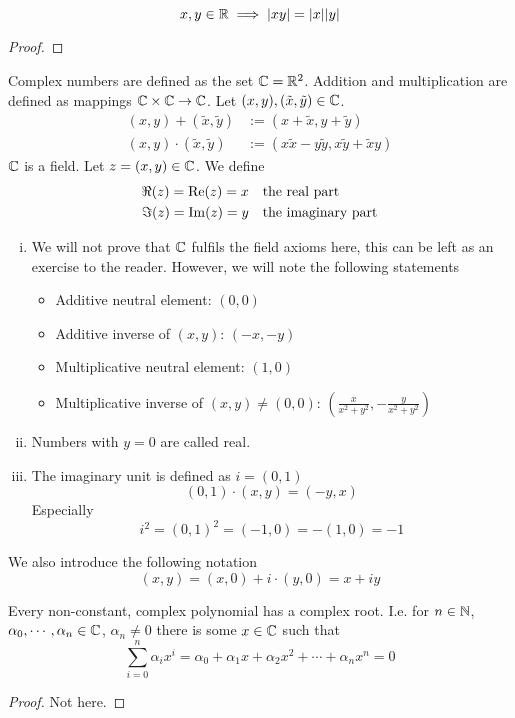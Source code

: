 \documentclass[../../script.tex]{subfiles}
\begin{document}
\begin{thm}
\[
	x, y \in \mathbb{R} \implies |xy| = |x||y|
\]
\end{thm}
\begin{proof}
\reader
\end{proof}

\begin{defi}
Complex numbers are defined as the set $\mathbb{C} = \mathbb{R}^2$. Addition and multiplication are defined as mappings $\mathbb{C} \times \mathbb{C} \rightarrow \mathbb{C}$. Let $(x, y), (\tilde{x}, \tilde{y}) \in \mathbb{C}$.
\begin{align*}
	(x, y) + (\tilde{x}, \tilde{y}) &:= (x + \tilde{x}, y + \tilde{y}) \\
	(x, y) \cdot (\tilde{x}, \tilde{y}) &:= (x\tilde{x} - y\tilde{y}, x\tilde{y} + \tilde{x}y)
\end{align*}
$\mathbb{C}$ is a field. Let $z = (x, y) \in \mathbb{C}$. We define
\begin{align*}
	\real(z) = \Re(z) = x& ~~\text{ the real part} \\
	\imag(z) = \Im(z) = y& ~~\text{ the imaginary part}
\end{align*}
\end{defi}

\begin{rem}\leavevmode
\begin{enumerate}[(i)]
	\item We will not prove that $\mathbb{C}$ fulfils the field axioms here, this can be left as an exercise to the reader. However, we will note the following statements
	\begin{itemize}
		\item Additive neutral element: $(0, 0)$
		\item Additive inverse of $(x, y)$: $(-x, -y)$
		\item Multiplicative neutral element: $(1, 0)$
		\item Multiplicative inverse of $(x, y) \ne (0, 0)$: $\left( \frac{x}{x^2 + y^2}, -\frac{y}{x^2 + y^2} \right)$
	\end{itemize}
	
	\item Numbers with $y = 0$ are called real.
	
	\item The imaginary unit is defined as $i = (0, 1)$
	\[
		(0, 1) \cdot (x, y) = (-y, x)
	\]
	Especially
	\[
		i^2 = (0, 1)^2 = (-1, 0) = -(1, 0) = -1
	\]
\end{enumerate}
We also introduce the following notation
\[
	(x, y) = (x, 0) + i\cdot(y, 0) = x + iy
\]
\end{rem}

\begin{thm}
Every non-constant, complex polynomial has a complex root. I.e. for $n \in \mathbb{N}$, $\alpha_0, \cdots, \alpha_n \in \mathbb{C}$, $\alpha_n \ne 0$ there is some $x \in \mathbb{C}$ such that
\[
	\sum_{i = 0}^n \alpha_i x^i = \alpha_0 + \alpha_1 x + \alpha_2 x^2 + \cdots + \alpha_n x^n = 0
\]
\end{thm}
\begin{proof}
Not here.
\end{proof}
\end{document}

